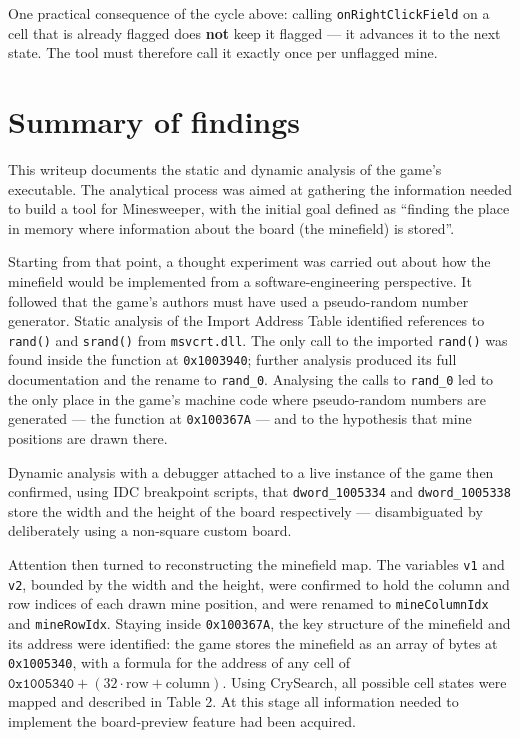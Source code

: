 \documentclass[11pt,a4paper]{article}
\begin{document}
One practical consequence of the cycle above: calling \texttt{onRightClickField} on a cell that
is already flagged does \textbf{not} keep it flagged --- it advances it to the next state. The
tool must therefore call it exactly once per unflagged mine.


\section{Summary of findings}

This writeup documents the static and dynamic analysis of the game's executable. The analytical
process was aimed at gathering the information needed to build a tool for Minesweeper, with the
initial goal defined as ``finding the place in memory where information about the board (the
minefield) is stored''.

Starting from that point, a thought experiment was carried out about how the minefield would be
implemented from a software-engineering perspective. It followed that the game's authors must
have used a pseudo-random number generator. Static analysis of the Import Address Table
identified references to \texttt{rand()} and \texttt{srand()} from \texttt{msvcrt.dll}. The only
call to the imported \texttt{rand()} was found inside the function at \texttt{0x1003940};
further analysis produced its full documentation and the rename to \texttt{rand\_0}. Analysing
the calls to \texttt{rand\_0} led to the only place in the game's machine code where
pseudo-random numbers are generated --- the function at \texttt{0x100367A} --- and to the
hypothesis that mine positions are drawn there.

Dynamic analysis with a debugger attached to a live instance of the game then confirmed, using
IDC breakpoint scripts, that \texttt{dword\_1005334} and \texttt{dword\_1005338} store the width
and the height of the board respectively --- disambiguated by deliberately using a non-square
custom board.

Attention then turned to reconstructing the minefield map. The variables \texttt{v1} and
\texttt{v2}, bounded by the width and the height, were confirmed to hold the column and row
indices of each drawn mine position, and were renamed to \texttt{mineColumnIdx} and
\texttt{mineRowIdx}. Staying inside \texttt{0x100367A}, the key structure of the minefield and
its address were identified: the game stores the minefield as an array of bytes at
\texttt{0x1005340}, with a formula for the address of any cell of
$\texttt{0x1005340} + (32 \cdot \text{row} + \text{column})$. Using CrySearch, all possible cell
states were mapped and described in Table 2. At this stage all information needed to implement
the board-preview feature had been acquired.
\end{document}
